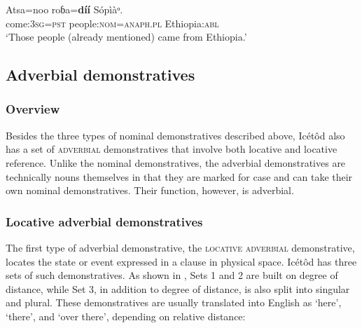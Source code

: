 \ea\label{ex:dem:6}
\gll Atsa=noo     roɓa=\textbf{díí}            Sópìàᵒ. \\
come:\textsc{3sg}=\textsc{pst}   people:\textsc{nom}=\textsc{anaph.pl}  Ethiopia:\textsc{abl}    \\
\glt ‘Those people (already mentioned) came from Ethiopia.’ 
\z






\subsection{Adverbial demonstratives}\label{sec:6.5}
\subsubsection{Overview}\label{sec:6.5.1}

Besides the three types of nominal demonstratives described above, Icétôd also has a set of \textsc{adverbial} demonstratives that involve both locative and  locative reference. Unlike the nominal demonstratives, the adverbial demonstratives are technically nouns themselves in that they are marked for case and can take their own nominal demonstratives. Their function, however, is adverbial.


\subsubsection{Locative adverbial demonstratives}\label{sec:6.5.2}

The first type of adverbial demonstrative, the \textsc{locative adverbial} demonstrative, locates the state or event expressed in a clause in physical space. Icétôd has three sets of such demonstratives. As shown in , Sets 1 and 2 are built on degree of distance, while Set 3, in addition to degree of distance, is also split into singular and plural. These demonstratives are usually translated into English as ‘here’, ‘there’, and ‘over there’, depending on relative distance:


